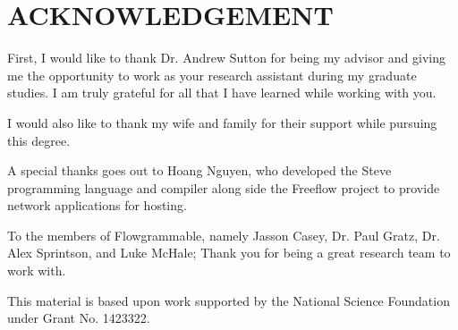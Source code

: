 \chapter*{ACKNOWLEDGEMENT}

First, I would like to thank Dr. Andrew Sutton for being my advisor and giving
me the opportunity to work as your research assistant during my graduate studies.
I am truly grateful for all that I have learned while working with you.

I would also like to thank my wife and family for their support while pursuing
this degree.

A special thanks goes out to Hoang Nguyen, who developed the Steve programming
language and compiler along side the Freeflow project to provide network applications for hosting.

To the members of Flowgrammable, namely Jasson Casey, Dr.
Paul Gratz, Dr. Alex Sprintson, and Luke McHale; Thank you for being a great research
team to work with.

This material is based upon work supported by the National Science Foundation under Grant No. 1423322.
